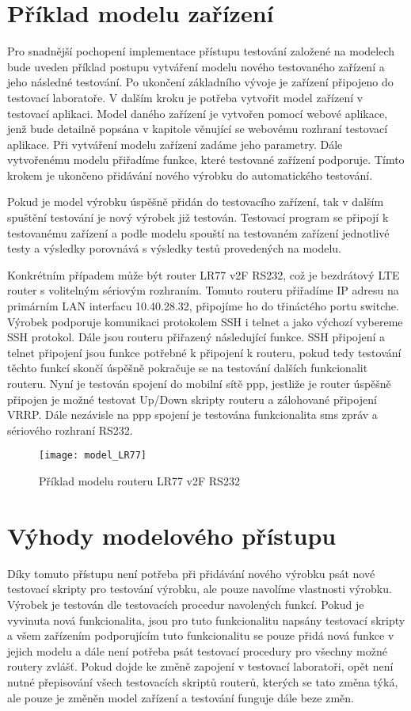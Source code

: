 \section{Příklad modelu zařízení}
Pro snadnější pochopení implementace přístupu testování založené na modelech bude uveden příklad postupu vytváření modelu nového testovaného zařízení a jeho následné testování. Po ukončení základního vývoje je zařízení připojeno do testovací laboratoře. V dalším kroku je potřeba vytvořit model zařízení v testovací aplikaci. Model daného zařízení je vytvořen pomocí webové aplikace, jenž bude detailně popsána v kapitole věnující se webovému rozhraní testovací aplikace. Při vytváření modelu zařízení zadáme jeho parametry. Dále vytvořenému modelu přiřadíme funkce, které testované zařízení podporuje. Tímto krokem je ukončeno přidávání nového výrobku do automatického testování.

Pokud je model výrobku úspěšně přidán do testovacího zařízení, tak v dalším spuštění testování je nový výrobek již testován. Testovací program se připojí k testovanému zařízení a podle modelu spouští na testovaném zařízení jednotlivé testy a výsledky porovnává s výsledky testů provedených na modelu.

Konkrétním případem může být router LR77 v2F RS232, což je bezdrátový LTE router s volitelným sériovým rozhraním. Tomuto routeru přiřadíme IP adresu na primárním LAN interfacu 10.40.28.32, připojíme ho do třináctého portu switche. Výrobek podporuje komunikaci protokolem SSH i telnet a jako výchozí vybereme SSH protokol. Dále jsou  routeru přiřazený následující funkce. SSH připojení a telnet připojení jsou funkce potřebné k připojení k routeru, pokud tedy testování těchto funkcí skončí úspěšně pokračuje se na testování dalších funkcionalit routeru. Nyní je testován spojení do mobilní sítě ppp, jestliže je router úspěšně připojen je možné testovat Up/Down skripty routeru a zálohované připojení VRRP. Dále nezávisle na ppp spojení je testována funkcionalita sms zpráv a sériového rozhraní RS232.

\begin{figure}[h]
  \centering
  \texttt{[image: model\_LR77]}
  \caption{Příklad modelu routeru LR77 v2F RS232}
  \label{fig:model_LR77}
\end{figure}

\section{Výhody modelového přístupu}
Díky tomuto přístupu není potřeba při přidávání nového výrobku psát nové testovací skripty pro testování výrobku, ale pouze navolíme vlastnosti výrobku. Výrobek je testován dle testovacích procedur navolených funkcí. Pokud je vyvinuta nová funkcionalita, jsou pro tuto funkcionalitu napsány testovací skripty a všem zařízením podporujícím tuto funkcionalitu se pouze přidá nová funkce v jejich modelu a dále není potřeba psát testovací procedury pro všechny možné routery zvlášť. Pokud dojde ke změně zapojení v testovací laboratoři, opět není nutné přepisování všech testovacích skriptů routerů, kterých se tato změna týká, ale pouze je změněn model zařízení a testování funguje dále beze změn.

\endinput
